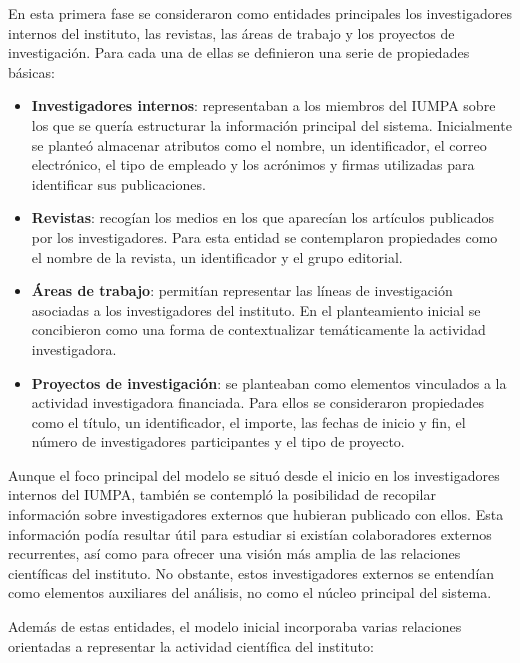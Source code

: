 \documentclass[11pt,spanish,listoffigures,listoftables]{tfgetsinf}
\begin{document}
En esta primera fase se consideraron como entidades principales los investigadores internos del instituto, las revistas, las áreas de trabajo y los proyectos de investigación. Para cada una de ellas se definieron una serie de propiedades básicas:

\begin{itemize}
    \item \textbf{Investigadores internos}: representaban a los miembros del IUMPA sobre los que se quería estructurar la información principal del sistema. Inicialmente se planteó almacenar atributos como el nombre, un identificador, el correo electrónico, el tipo de empleado y los acrónimos y firmas utilizadas para identificar sus publicaciones.

    \item \textbf{Revistas}: recogían los medios en los que aparecían los artículos publicados por los investigadores. Para esta entidad se contemplaron propiedades como el nombre de la revista, un identificador y el grupo editorial.

    \item \textbf{Áreas de trabajo}: permitían representar las líneas de investigación asociadas a los investigadores del instituto. En el planteamiento inicial se concibieron como una forma de contextualizar temáticamente la actividad investigadora.

    \item \textbf{Proyectos de investigación}: se planteaban como elementos vinculados a la actividad investigadora financiada. Para ellos se consideraron propiedades como el título, un identificador, el importe, las fechas de inicio y fin, el número de investigadores participantes y el tipo de proyecto.
\end{itemize}

Aunque el foco principal del modelo se situó desde el inicio en los investigadores internos del IUMPA, también se contempló la posibilidad de recopilar información sobre investigadores externos que hubieran publicado con ellos. Esta información podía resultar útil para estudiar si existían colaboradores externos recurrentes, así como para ofrecer una visión más amplia de las relaciones científicas del instituto. No obstante, estos investigadores externos se entendían como elementos auxiliares del análisis, no como el núcleo principal del sistema.

Además de estas entidades, el modelo inicial incorporaba varias relaciones orientadas a representar la actividad científica del instituto:
\end{document}
